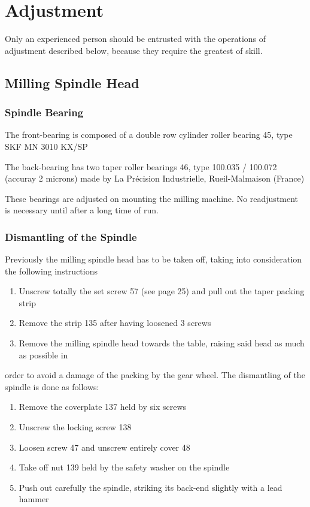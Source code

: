 \chapter{Adjustment}\label{chap:adjustments}

Only an experienced person should be entrusted with the operations of adjustment described below,
because they require the greatest of skill.

\section*{Milling Spindle Head}

\subsection*{Spindle Bearing}

The front-bearing is composed of a double row cylinder roller bearing 45, type SKF MN 3010 KX/SP

The back-bearing has two taper roller bearings 46, type 100.035 / 100.072 (accuray 2 microns) made
by La Précision Industrielle, Rueil-Malmaison (France)

These bearings are adjusted on mounting the milling machine. No readjustment is necessary until after
a long time of run.

\subsection*{Dismantling of the Spindle}

Previously the milling spindle head has to be taken off, taking into consideration the following
instructions

\begin{enumerate}
    \item Unscrew totally the set screw 57 (see page 25) and pull out the taper packing strip
    \item Remove the strip 135 after having loosened 3 screws
    \item Remove the milling spindle head towards the table, raising said head as much as possible in
\end{enumerate}

order to avoid a damage of the packing by the gear wheel.
The dismantling of the spindle is done as follows:

\begin{enumerate}
    \item Remove the coverplate 137 held by six screws
    \item Unscrew the locking screw 138
    \item Loosen screw 47 and unscrew entirely cover 48
    \item Take off nut 139 held by the safety washer on the spindle
    \item Push out carefully the spindle, striking its back-end slightly with a lead hammer
\end{enumerate}

